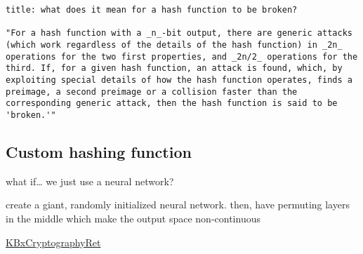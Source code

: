 \documentclass[letterpaper]{article}
\begin{document}
\begin{verbatim}
title: what does it mean for a hash function to be broken?

"For a hash function with a _n_-bit output, there are generic attacks (which work regardless of the details of the hash function) in _2n_ operations for the two first properties, and _2n/2_ operations for the third. If, for a given hash function, an attack is found, which, by exploiting special details of how the hash function operates, finds a preimage, a second preimage or a collision faster than the corresponding generic attack, then the hash function is said to be 'broken.'"
\end{verbatim}

\subsection{Custom hashing function}
\label{sec:org5e88917}
what if\ldots{} we just use a neural network?

create a giant, randomly initialized neural network. then, have
permuting layers in the middle which make the output space
non-continuous

\href{KBxCryptographyRet.org}{KBxCryptographyRet}
\end{document}
